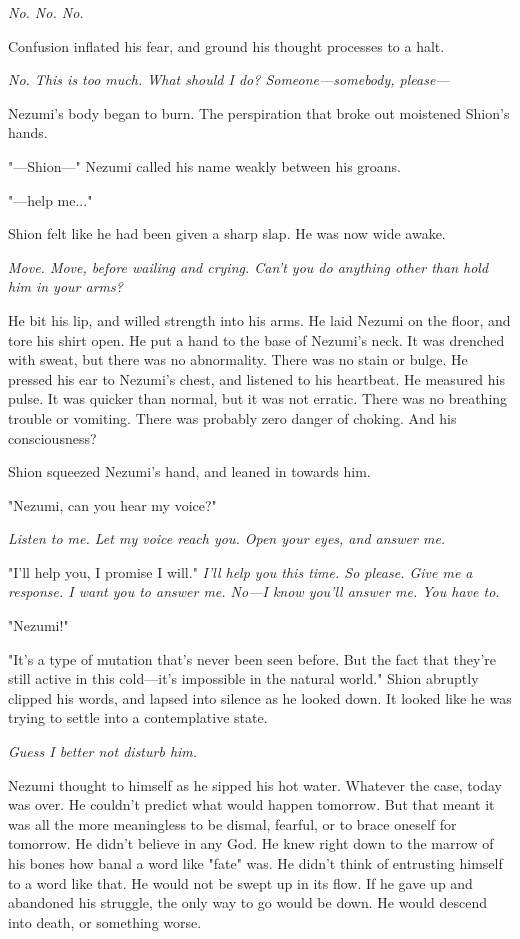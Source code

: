\emph{No. No. No.}

Confusion inflated his fear, and ground his thought processes to a halt.

\emph{No. This is too much. What should I do? Someone---somebody, please---}

Nezumi's body began to burn. The perspiration that broke out moistened
Shion's hands.

"---Shion---" Nezumi called his name weakly between his groans.

"---help me..."

Shion felt like he had been given a sharp slap. He was now wide awake.

\emph{Move. Move, before wailing and crying. Can't you do anything other than
hold him in your arms?}

He bit his lip, and willed strength into his arms. He laid Nezumi on the
floor, and tore his shirt open. He put a hand to the base of Nezumi's
neck. It was drenched with sweat, but there was no abnormality. There
was no stain or bulge. He pressed his ear to Nezumi's chest, and
listened to his heartbeat. He measured his pulse. It was quicker than
normal, but it was not erratic. There was no breathing trouble or
vomiting. There was probably zero danger of choking. And his
consciousness?

Shion squeezed Nezumi's hand, and leaned in towards him.

"Nezumi, can you hear my voice?"

\emph{Listen to me. Let my voice reach you. Open your eyes, and answer me.}

"I'll help you, I promise I will." \emph{I'll help you this time. So please.
Give me a response. I want you to answer me. No---I know you'll answer me.
You have to.}

"Nezumi!"

\myspace

"It's a type of mutation that's never been seen before. But the fact
that they're still active in this cold---it's impossible in the natural
world." Shion abruptly clipped his words, and lapsed into silence as he
looked down. It looked like he was trying to settle into a contemplative
state.

\emph{Guess I better not disturb him.}

Nezumi thought to himself as he sipped his hot water. Whatever the case,
today was over. He couldn't predict what would happen tomorrow. But that
meant it was all the more meaningless to be dismal, fearful, or to brace
oneself for tomorrow. He didn't believe in any God. He knew right down
to the marrow of his bones how banal a word like "fate" was. He didn't
think of entrusting himself to a word like that. He would not be swept
up in its flow. If he gave up and abandoned his struggle, the only way
to go would be down. He would descend into death, or something worse.

